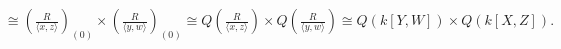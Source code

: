 \begin{example*}
\begin{enumerate}
\begin{align*}
                &\cong \left(\frac{R}{\langle x,z \rangle}\right)_{(0)} \times \left(\frac{R}{\langle y,w \rangle}\right)_{(0)} \cong Q\left(\frac{R}{\langle x,z \rangle}\right) \times Q\left(\frac{R}{\langle y,w \rangle}\right) \cong Q(k[Y,W]) \times Q(k[X,Z]).
            \end{align*}
            \begin{comment}
            \par Let $R_1: = \frac{R}{\langle \overbar{X}, \overbar{Z} \rangle} \cong k[Y,W]$ and $R_2 := \frac{R}{\langle \overbar{Y}, \overbar{W} \rangle} \cong k[X,Z]$. Note $R_1$ is an integral domain and $U^{-1}R_1$ is a field. By UMP, there exists a unique ring homomorphism $\overbar{\varphi}_1$ such that the following diagram commutes. Also, since $\overbar{\varphi}_1 \neq 0$ and $\operatorname{Q}(R_1)$ is a field, $\overbar{\varphi}_1$ is 1-1. Let $\frac{r}{u} \in U^{-1}R_1$ with $r \in R$ and $u \in \pi_1(U) = \pi_1(R \setminus (\langle \overbar{X},\overbar{Z} \rangle \cup \langle \overbar{Y}, \overbar{W} \rangle)) \subseteq R_1 \setminus \{0\}$. Then $\frac{r}{u} \in \operatorname{Q}(R_1)$. Since $\overbar{\varphi}_1(\frac{r}{u}) = \frac{\varphi_1(r)}{\varphi_1(u)} = \frac{r/1}{u/1} = \frac{r}{u}$, we have $\overbar{\varphi_1}$ is onto. Hence $\operatorname{Q}(R_1) \cong U^{-1}R_1$. Similarly, $\operatorname{Q}(R_2) \cong U^{-1}R_2$.
             \begin{center}
                \begin{tikzpicture}[node distance = 1.5cm, auto]
                    \node (R) {$R_1$};
                    \node (QR)[right of=R] {$\operatorname{Q}(R_1)$};
                    \node (L)[below of=QR] {$U^{-1}R_1$};
                    \node (r)[node distance=0.7cm, left of=R, above of=R] {$r_1$};
                    \node (qr)[node distance=0.7cm, right of=QR, above of=QR] {$\frac{r_1}{1}$};
                    \node (qru)[node distance=1.6cm, right of=QR] {$\frac{r_1}{u_1}$};
                    \node (lu)[below of=qru] {$\frac{\varphi_1(r_1)}{\varphi_1(u_1)}$};
                    \node (l)[node distance=0.7cm, below of=L] {$r_1/1 = \frac{r_1/1}{1/1}$};
                    \draw[->] (R) to node {$\psi_1$} (QR);
                    \draw[right hook->] (R) to node [swap]{$\varphi_1$} (L);
                    \draw[->,dashed] (QR) to node {$\ex !\ \overbar \varphi_1$} (L);
                    \draw[|->] (r) to node {} (qr);
                    \draw[|->,bend right] (r) to node {} (l);
                    \draw[|->,bend left=45] (qr) to node {} (l);
                    \draw[|->] (qru) to node {} (lu);

\end{comment}
\end{enumerate}
\end{example*}
